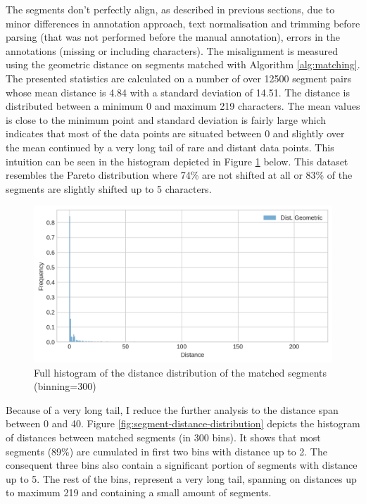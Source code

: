 The segments don't perfectly align, as described in previous sections, due to minor differences in annotation approach, text normalisation and trimming before parsing (that was not performed before the manual annotation), errors in the annotations (missing or including characters). The misalignment is measured using the geometric distance 
on segments matched with Algorithm \ref{alg:matching}. The presented statistics are calculated on a number of over 12500 segment pairs whose mean distance is 4.84 with a standard deviation of 14.51. The distance is distributed between a minimum 0 and maximum 219 characters. The mean values is close to the minimum point and standard deviation is fairly large which indicates that most of the data points are situated between 0 and slightly over the mean continued by a very long tail of rare and distant data points. This intuition can be seen in the histogram depicted in Figure \ref{fig:segment-distance-histogram-full} below. This dataset resembles the Pareto distribution where 74\% are not shifted at all or 83\% of the segments are slightly shifted up to 5 characters.

\begin{figure}[!ht]
    \centering
    \includegraphics[width=.65\textwidth]{evaluation-results/figures/distance-distr-histogram-full}
    \caption{Full histogram of the distance distribution of the matched segments (binning=300)}
    \label{fig:segment-distance-histogram-full}
\end{figure}

Because of a very long tail, I reduce the further analysis to the distance span between 0 and 40. Figure \ref{fig:segment-distance-distribution} depicts the histogram of distances between matched segments (in 300 bins). It shows that most segments (89\%) are cumulated in first two bins with distance up to 2. The consequent three bins also contain a significant portion of segments with distance up to 5. The rest of the bins, represent a very long tail, spanning on distances up to maximum 219 and containing a small amount of segments. 

